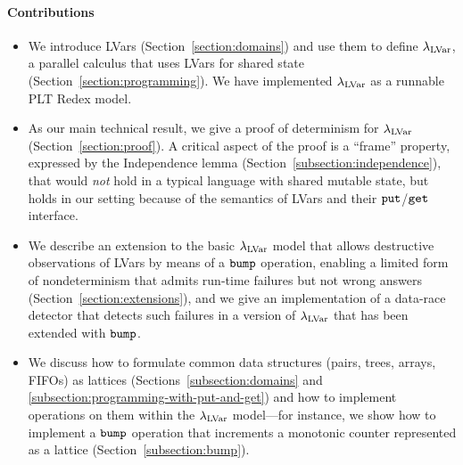 \paragraph{Contributions} 
\begin{itemize}
\item We introduce LVars 
  (Section~\ref{section:domains}) and use them to define
  $\lambda_{\textrm{LVar}}$, a parallel calculus 
  that uses LVars for shared state 
  (Section~\ref{section:programming}).
  We have implemented $\lambda_{\textrm{LVar}}$ as a runnable PLT
  Redex model.


\item As our main technical result, we give a proof of determinism
  for $\lambda_{\textrm{LVar}}$ (Section~\ref{section:proof}).  A critical aspect
  of the proof is a ``frame'' property, expressed by the
  Independence lemma (Section~\ref{subsection:independence}),
  that would {\em not} hold in a typical language with shared mutable
  state, but holds in our setting because of the semantics of LVars
  and their $\mbox{\texttt{put}}$/$\mbox{\texttt{get}}$ interface.


\item We describe an extension to the basic $\lambda_{\textrm{LVar}}$ model
  that allows
  destructive observations of LVars by means of a $\mbox{\texttt{bump}}$
  operation, enabling a limited form of nondeterminism that admits
  run-time failures but not wrong answers (Section~\ref{section:extensions}),
  and we give an implementation of a data-race detector that detects 
  such failures in a version of $\lambda_{\textrm{LVar}}$ that has been extended with $\mbox{\texttt{bump}}$.

\item
  We discuss how to
  formulate common data structures (pairs, trees, arrays, FIFOs) as
  lattices (Sections~\ref{subsection:domains} and
  \ref{subsection:programming-with-put-and-get})
  and how to implement operations on them within the $\lambda_{\textrm{LVar}}$ model---for instance,
  we show how to implement a $\mbox{\texttt{bump}}$ operation that increments a
  monotonic counter represented as a lattice
  (Section~\ref{subsection:bump}).


\end{itemize}
